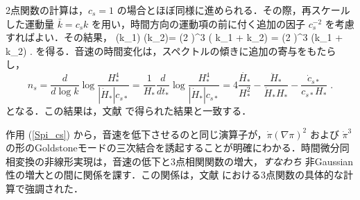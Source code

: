 2点関数の計算は，$c_s=1$ の場合とほぼ同様に進められる．その際，再スケールした運動量 $\bar k=c_s k$ を用い，時間方向の運動項の前に付く追加の因子 $c_s^{-2}$ を考慮すればよい．その結果，
\be
\label{eq:spectrumzetacs}
\langle \zeta(\vec k_1) \zeta(\vec k_2)\rangle = (2 \pi)^3 \delta(\vec
k_1 + \vec k_2)   \cdot {} = (2
\pi)^3 \delta(\vec k_1 + \vec k_2)  \cdot {}  \;.
\ee
を得る．音速の時間変化は，スペクトルの傾きに追加の寄与をもたらし，
\begin{equation}
n_s=\frac{d}{d \log k}\log \frac{H^4_{*}}{|\dot{H}_*|
c_{s*}}=\frac{1}{H_*}\frac{d}{dt_*}\log \frac{H^4_{*}}{|\dot{H}_*|
c_{s*}} =4\frac{\dot{H_*}}{H^2_*}-\frac{\ddot{H}_*}{\dot{H}_*
H_* }-\frac{\dot{c}_{s*}}{c_{s*}H_{*}} \;.
\end{equation}
となる．この結果は，文献 \cite{Garriga:1999vw} で得られた結果と一致する．

作用 (\ref{Spi_cs}) から，音速を低下させるのと同じ演算子が，$\dot{\pi}(\nabla\pi)^2$ および $\dot\pi^3$ の形のGoldstoneモードの三次結合を誘起することが明確にわかる．時間微分同相変換の非線形実現は，音速の低下と3点相関関数の増大，{\em すなわち} 非Gaussian性の増大との間に関係を課す．この関係は，文献 \cite{Chen:2006nt} における3点関数の具体的な計算で強調された．

